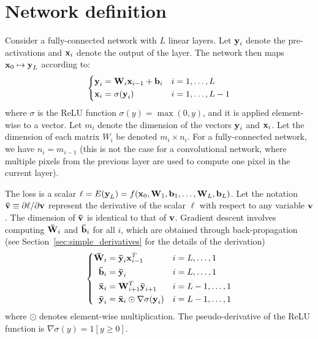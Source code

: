 \section{Network definition}

Consider a fully-connected network with $L$ linear layers.
Let $\boldsymbol{\mathbf{y}}_{i}$ denote the pre-activations and $\boldsymbol{\mathbf{x}}_{i}$ denote the output of the layer.
The network then maps $\boldsymbol{\mathbf{x}}_{0} \mapsto \boldsymbol{\mathbf{y}}_{L}$ according to:
\begin{equation}
\left\{ \begin{aligned}
\boldsymbol{\mathbf{y}}_{i} & = \boldsymbol{\mathbf{W}}_{i} \boldsymbol{\mathbf{x}}_{i - 1} + \boldsymbol{\mathbf{b}}_{i} && i = 1, \dots, L\\
\boldsymbol{\mathbf{x}}_{i} & = \sigma(\boldsymbol{\mathbf{y}}_{i}) && i = 1, \dots, L - 1
\end{aligned} \right.
\end{equation}
where $\sigma$ is the ReLU function $\sigma(y) = \max(0, y)$, and it is applied element-wise to a vector.
Let $m_{i}$ denote the dimension of the vectors $\boldsymbol{\mathbf{y}}_{i}$ and $\boldsymbol{\mathbf{x}}_{i}$.
Let the dimension of each matrix $W_{i}$ be denoted $m_{i} \times n_{i}$.
For a fully-connected network, we have $n_{i} = m_{i-1}$ (this is not the case for a convolutional network, where multiple pixels from the previous layer are used to compute one pixel in the current layer).

The loss is a scalar $\ell = E(\boldsymbol{\mathbf{y}}_{L}) = f(\boldsymbol{\mathbf{x}}_{0}, \boldsymbol{\mathbf{W}}_{1}, \boldsymbol{\mathbf{b}}_{1}, \dots, \boldsymbol{\mathbf{W}}_{L}, \boldsymbol{\mathbf{b}}_{L})$.
Let the notation $\boldsymbol{\mathbf{\bar{v}}} \equiv \partial \ell / \partial \boldsymbol{\mathbf{v}}$ represent the derivative of the scalar $\ell$ with respect to any variable $\boldsymbol{\mathbf{v}}$.
The dimension of $\boldsymbol{\mathbf{\bar{v}}}$ is identical to that of $\boldsymbol{\mathbf{v}}$.
Gradient descent involves computing $\boldsymbol{\mathbf{\bar{W}}}_{i}$ and $\boldsymbol{\mathbf{\bar{b}}}_{i}$ for all $i$, which are obtained through back-propagation (see Section~\ref{sec:simple_derivatives} for the details of the derivation)
\begin{equation}
\left\{ \begin{aligned}
\boldsymbol{\mathbf{\bar{W}}}_{i} & = \boldsymbol{\mathbf{\bar{y}}}_{i} \boldsymbol{\mathbf{x}}_{i - 1}^T & i & = L, \dots, 1 \\
\boldsymbol{\mathbf{\bar{b}}}_{i} & = \boldsymbol{\mathbf{\bar{y}}}_{i} & i & = L, \dots, 1 \\
\boldsymbol{\mathbf{\bar{x}}}_{i} & = \boldsymbol{\mathbf{W}}_{i + 1}^T \boldsymbol{\mathbf{\bar{y}}}_{i + 1} & i & = L-1, \dots, 1 \\
\boldsymbol{\mathbf{\bar{y}}}_{i} & = \boldsymbol{\mathbf{\bar{x}}}_{i} \odot \nabla\sigma(\boldsymbol{\mathbf{y}}_{i}) & i & = L - 1, \dots, 1
\end{aligned} \right.
\end{equation}
where $\odot$ denotes element-wise multiplication.
The pseudo-derivative of the ReLU function is $\nabla\sigma(y) = 1[y \ge 0]$.

